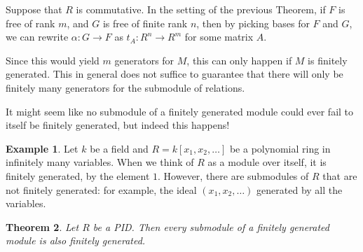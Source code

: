 \documentclass[12pt]{report}
\newtheorem{theorem}{Theorem}[chapter]
\numberwithin{equation}{section}
\numberwithin{theorem}{chapter}
\theoremstyle{definition}
\newtheorem{example}[theorem]{Example}
\newtheorem*{basic properties}{Basic Properties}
\newtheorem*{Important Remark}{Important Remark}
\begin{document}
Suppose that $R$ is commutative. In the setting of the previous Theorem, if $F$ is free of rank $m$, and $G$ is free of finite rank $n$, then by picking bases for $F$ and $G$, we can rewrite $\alpha:G\to F$ as $t_A: R^n \to R^m$ for some matrix $A$.

Since this would yield $m$ generators for $M$, this can only happen if $M$ is finitely generated. This in general does not suffice to guarantee that there will only be finitely many generators for the submodule of relations.

It might seem like no submodule of a finitely generated module could ever fail to itself be finitely generated, but indeed this happens! 

\begin{example}
	Let $k$ be a field and $R = k[x_1, x_2, \ldots]$ be a polynomial ring in infinitely many variables. When we think of $R$ as a module over itself, it is finitely generated, by the element $1$. However, there are submodules of $R$ that are not finitely generated: for example, the ideal $(x_1, x_2, \ldots)$ generated by all the variables.
\end{example}





\begin{theorem}\label{noeth submods of fg are fg}
Let $R$ be a PID. Then every submodule of a finitely generated module is also finitely generated.
\end{theorem}
\end{document}
